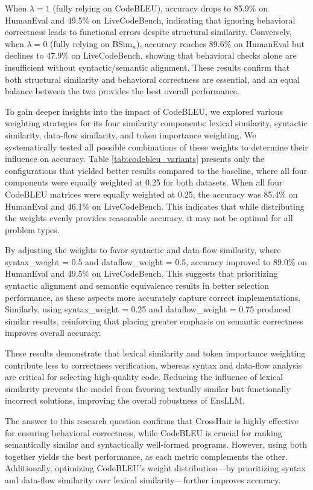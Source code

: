 \documentclass{article}
\newcommand{\tool}{EnsLLM}
\begin{document}
When \(\lambda = 1\) (fully relying on CodeBLEU), accuracy drops to 85.9\% on HumanEval and 49.5\% on LiveCodeBench, indicating that ignoring behavioral correctness leads to functional errors despite structural similarity. Conversely, when \(\lambda = 0\) (fully relying on BSim\(_n\)), accuracy reaches 89.6\% on HumanEval but declines to 47.9\% on LiveCodeBench, showing that behavioral checks alone are insufficient without syntactic/semantic alignment. These results confirm that both structural similarity and behavioral correctness are essential, and an equal balance between the two provides the best overall performance.


To gain deeper insights into the impact of CodeBLEU, we explored various weighting strategies for its four similarity components: lexical similarity, syntactic similarity, data-flow similarity, and token importance weighting. We systematically tested all possible combinations of these weights to determine their influence on accuracy. Table \ref{tab:codebleu_variants} presents only the configurations that yielded better results compared to the baseline, where all four components were equally weighted at 0.25 for both datasets. When all four CodeBLEU matrices were equally weighted at 0.25, the accuracy was 85.4\% on HumanEval and 46.1\% on LiveCodeBench. This indicates that while distributing the weights evenly provides reasonable accuracy, it may not be optimal for all problem types.

By adjusting the weights to favor syntactic and data-flow similarity, where syntax\_weight = 0.5 and dataflow\_weight = 0.5, accuracy improved to 89.0\% on HumanEval and 49.5\% on LiveCodeBench. This suggests that prioritizing syntactic alignment and semantic equivalence results in better selection performance, as these aspects more accurately capture correct implementations. Similarly, using syntax\_weight = 0.25 and dataflow\_weight = 0.75 produced similar results, reinforcing that placing greater emphasis on semantic correctness improves overall accuracy.

These results demonstrate that lexical similarity and token importance weighting contribute less to correctness verification, whereas syntax and data-flow analysis are critical for selecting high-quality code. Reducing the influence of lexical similarity prevents the model from favoring textually similar but functionally incorrect solutions, improving the overall robustness of \tool.

The answer to this research question confirms that CrossHair is highly effective for ensuring behavioral correctness, while CodeBLEU is crucial for ranking semantically similar and syntactically well-formed programs. However, using both together yields the best performance, as each metric complements the other. Additionally, optimizing CodeBLEU’s weight distribution—by prioritizing syntax and data-flow similarity over lexical similarity—further improves accuracy.
\end{document}
